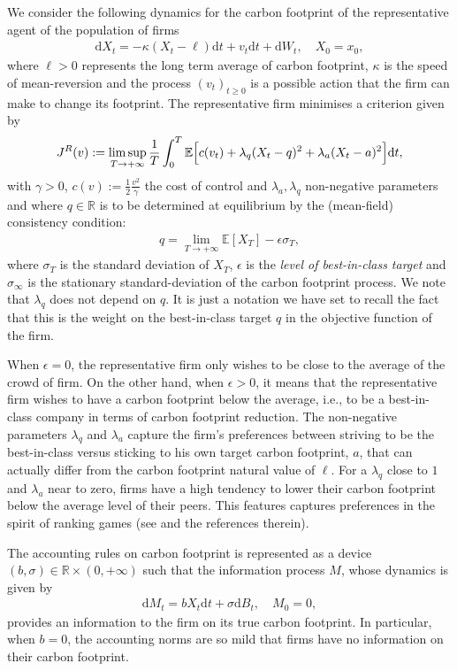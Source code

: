 \documentclass[a4paper,10pt]{article}
\newcommand{\EE}{\mathbb{E}}
\newcommand{\RR}{\mathbb{R}}
\newcommand{\D}{\mathrm{d}}
\theoremstyle{definition}
\theoremstyle{plain}
\numberwithin{equation}{section}
\begin{document}
We consider the following dynamics for the carbon footprint of the representative agent of the population of firms
\begin{align}
    \D X_t = -\kappa (X_t  - \ell) \D t +  v_t \D t + \D W_t, \quad X_0 = x_0,
\end{align}
where $\ell>0$ represents the long term average of carbon footprint, $\kappa$ is the speed of mean-reversion and the process $(v_t)_{t\geq 0}$ is a possible action that the firm can make to change its footprint. 
The representative firm minimises a criterion given by
\begin{align}
    J^{\rm R}(v) 
    := \limsup_{T\to +\infty} \frac{1}{T}\int_0 ^T \EE\Big[ c(v_t) + \lambda_q (X_t - q)^2 + \lambda_a (X_t-a)^2 \Big] \D t,
\end{align}
with $\gamma>0$, $c(v) := \frac12 \frac{v^2}{\gamma}$ the cost of control and $\lambda_a, \lambda_q$ non-negative parameters and where $q \in \RR$ is to be determined at equilibrium by the (mean-field) consistency condition:  
\begin{align*}
q =\lim_{T\to +\infty}\mathbb E[X_T] - \epsilon \sigma_T,
\end{align*} 
where $\sigma_T$ is the standard deviation of $X_T$, $\epsilon$ is the {\em level of best-in-class target} and $\sigma_\infty$ is the stationary standard-deviation of the carbon footprint process. 
We note that $\lambda_q$ does not depend on $q$. It is just a notation we have set to recall the fact that this is the weight on the best-in-class target $q$ in the objective function of the firm.

When $\epsilon=0$, the representative firm only wishes to be close to the average of the crowd of firm. 
On the other hand, when $\epsilon>0$, it means that the representative firm wishes to have a carbon footprint below the average, i.e.,  to be a best-in-class company in terms of carbon footprint reduction. 
The non-negative parameters $\lambda_q$ and $\lambda_a$ capture the firm's preferences between striving to be the best-in-class  versus sticking to his own target carbon footprint, $a$, that can actually differ from the carbon footprint natural value of $\ell$. For a $\lambda_q$ close to $1$ and $\lambda_a$ near to zero, firms have a high tendency to lower their carbon footprint below the average level of their peers. This features captures  preferences in the spirit of ranking games (see \cite{Bayraktar16} and the references therein).

The accounting rules on carbon footprint is represented as a device $(b,\sigma) \in \mathbb R \times (0,+\infty)$ such that the information process $M$, whose dynamics is given by
\begin{align}
    \D M_t = bX_t \D t  + \sigma \D B_t, \quad M_0 =0,
\end{align}
provides an information to the firm on its true carbon footprint. 
In particular, when $b=0$, the accounting norms are so mild that firms have no information on their carbon footprint. 
\end{document}
